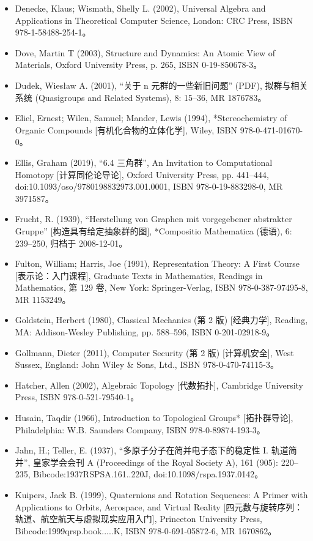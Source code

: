 \begin{itemize}
\item Denecke, Klaus; Wismath, Shelly L. (2002), Universal Algebra and Applications in Theoretical Computer Science, London: CRC Press, ISBN 978-1-58488-254-1。  
\item Dove, Martin T (2003), Structure and Dynamics: An Atomic View of Materials, Oxford University Press, p. 265, ISBN 0-19-850678-3。  
\item Dudek, Wiesław A. (2001), “关于 n 元群的一些新旧问题” (PDF), 拟群与相关系统 (Quasigroups and Related Systems), 8: 15–36, MR 1876783。  
\item Eliel, Ernest; Wilen, Samuel; Mander, Lewis (1994), *Stereochemistry of Organic Compounds [有机化合物的立体化学], Wiley, ISBN 978-0-471-01670-0。  
\item Ellis, Graham (2019), “6.4 三角群”, An Invitation to Computational Homotopy [计算同伦论导论], Oxford University Press, pp. 441–444, doi:10.1093/oso/9780198832973.001.0001, ISBN 978-0-19-883298-0, MR 3971587。  
\item Frucht, R. (1939), “Herstellung von Graphen mit vorgegebener abstrakter Gruppe” [构造具有给定抽象群的图], *Compositio Mathematica (德语), 6: 239–250, 归档于 2008-12-01。  
\item Fulton, William; Harris, Joe (1991), Representation Theory: A First Course [表示论：入门课程], Graduate Texts in Mathematics, Readings in Mathematics, 第 129 卷, New York: Springer-Verlag, ISBN 978-0-387-97495-8, MR 1153249。  
\item Goldstein, Herbert (1980), Classical Mechanics (第 2 版) [经典力学], Reading, MA: Addison-Wesley Publishing, pp. 588–596, ISBN 0-201-02918-9。  
\item Gollmann, Dieter (2011), Computer Security (第 2 版) [计算机安全], West Sussex, England: John Wiley & Sons, Ltd., ISBN 978-0-470-74115-3。  
\item Hatcher, Allen (2002), Algebraic Topology [代数拓扑], Cambridge University Press, ISBN 978-0-521-79540-1。  
\item Husain, Taqdir (1966), Introduction to Topological Groups* [拓扑群导论], Philadelphia: W.B. Saunders Company, ISBN 978-0-89874-193-3。
\item Jahn, H.; Teller, E. (1937), “多原子分子在简并电子态下的稳定性 I. 轨道简并”, 皇家学会会刊 A (Proceedings of the Royal Society A), 161 (905): 220–235, Bibcode:1937RSPSA.161..220J, doi:10.1098/rspa.1937.0142。  
\item Kuipers, Jack B. (1999), Quaternions and Rotation Sequences: A Primer with Applications to Orbits, Aerospace, and Virtual Reality [四元数与旋转序列：轨道、航空航天与虚拟现实应用入门], Princeton University Press, Bibcode:1999qrsp.book.....K, ISBN 978-0-691-05872-6, MR 1670862。  

\end{itemize}
